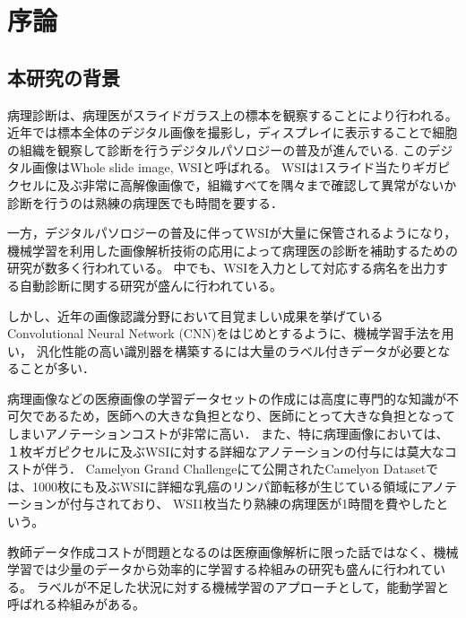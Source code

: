 \chapter{序論}

\section{本研究の背景}

病理診断は、病理医がスライドガラス上の標本を観察することにより行われる。
近年では標本全体のデジタル画像を撮影し，ディスプレイに表示することで細胞の組織を観察して診断を行うデジタルパソロジーの普及が進んでいる\cite{pantanowitz2010digital}.
このデジタル画像はWhole slide image, WSIと呼ばれる。
WSIは1スライド当たりギガピクセルに及ぶ非常に高解像画像で，組織すべてを隅々まで確認して異常がないか診断を行うのは熟練の病理医でも時間を要する．

一方，デジタルパソロジーの普及に伴ってWSIが大量に保管されるようになり，機械学習を利用した画像解析技術の応用によって病理医の診断を補助するための研究が数多く行われている\cite{gurcan2009histopathological, komuraishikawa, litjens2017survey}。
中でも、WSIを入力として対応する病名を出力する自動診断に関する研究が盛んに行われている\cite{doyle2008automated,dundar2011computerized}。

しかし、近年の画像認識分野において目覚ましい成果を挙げているConvolutional Neural Network (CNN)をはじめとするように、機械学習手法を用い，
汎化性能の高い識別器を構築するには大量のラベル付きデータが必要となることが多い．

病理画像などの医療画像の学習データセットの作成には高度に専門的な知識が不可欠であるため，医師への大きな負担となり、医師にとって大きな負担となってしまいアノテーションコストが非常に高い．
また、特に病理画像においては、１枚ギガピクセルに及ぶWSIに対する詳細なアノテーションの付与には莫大なコストが伴う．
Camelyon Grand Challenge\cite{Camelyon17}にて公開されたCamelyon Datasetでは、1000枚にも及ぶWSIに詳細な乳癌のリンパ節転移が生じている領域にアノテーションが付与されており、
WSI1枚当たり熟練の病理医が1時間を費やしたという。

教師データ作成コストが問題となるのは医療画像解析に限った話ではなく、機械学習では少量のデータから効率的に学習する枠組みの研究も盛んに行われている。
ラベルが不足した状況に対する機械学習のアプローチとして，能動学習と呼ばれる枠組みがある。

